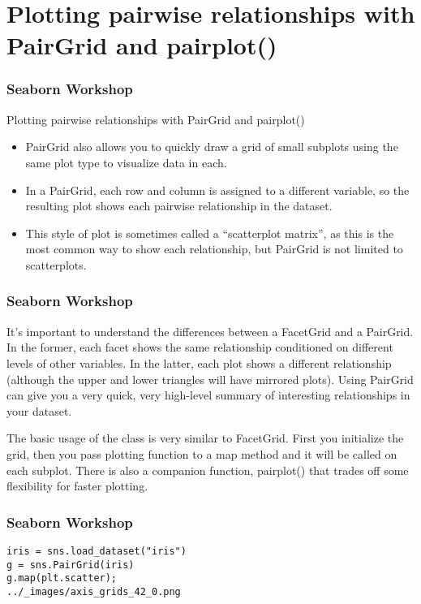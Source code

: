 \section{Plotting pairwise relationships with PairGrid and pairplot()}
\begin{frame}[fragile]
\frametitle{Seaborn Workshop}
\large
Plotting pairwise relationships with PairGrid and pairplot()
\begin{itemize}
\item PairGrid also allows you to quickly draw a grid of small subplots using the same plot type to visualize data in each. 
\item In a PairGrid, each row and column is assigned to a different variable, so the resulting plot shows each pairwise relationship in the dataset. 
\item This style of plot is sometimes called a “scatterplot matrix”, as this is the most common way to show each relationship, but PairGrid is not limited to scatterplots.
\end{itemize}
\end{frame}
\begin{frame}[fragile]
\frametitle{Seaborn Workshop}
\large

It’s important to understand the differences between a FacetGrid and a PairGrid. In the former, each facet shows the same relationship conditioned on different levels of other variables. In the latter, each plot shows a different relationship (although the upper and lower triangles will have mirrored plots). Using PairGrid can give you a very quick, very high-level summary of interesting relationships in your dataset.

The basic usage of the class is very similar to FacetGrid. First you initialize the grid, then you pass plotting function to a map method and it will be called on each subplot. There is also a companion function, pairplot() that trades off some flexibility for faster plotting.
\end{frame}
\begin{frame}[fragile]
\frametitle{Seaborn Workshop}
\large
\begin{framed}
	\begin{verbatim}
iris = sns.load_dataset("iris")
g = sns.PairGrid(iris)
g.map(plt.scatter);
../_images/axis_grids_42_0.png
\end{verbatim}
\end{framed}
\end{frame}
